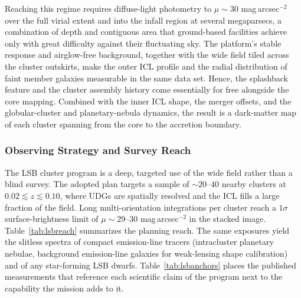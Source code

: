 Reaching this regime requires diffuse-light photometry to $\mu\sim30$ mag\,arcsec$^{-2}$ over the full virial extent and into the infall region at several megaparsecs, a combination of depth and contiguous area that ground-based facilities achieve only with great difficulty against their fluctuating sky. The platform's stable response and airglow-free background, together with the wide field tiled across the cluster outskirts, make the outer ICL profile and the radial distribution of faint member galaxies measurable in the same data set. Hence, the splashback feature and the cluster assembly history come essentially for free alongside the core mapping. Combined with the inner ICL shape, the merger offsets, and the globular-cluster and planetary-nebula dynamics, the result is a dark-matter map of each cluster spanning from the core to the accretion boundary.

\subsubsection{Observing Strategy and Survey Reach}

The LSB cluster program is a deep, targeted use of the wide field rather than a blind survey. The adopted plan targets a sample of $\sim20$--$40$ nearby clusters at $0.02\lesssim z\lesssim0.10$, where UDGs are spatially resolved and the ICL fills a large fraction of the field. Long multi-orientation integrations per cluster reach a $1\sigma$ surface-brightness limit of $\mu\sim29$--$30$ mag\,arcsec$^{-2}$ in the stacked image. Table~\ref{tab:lsbreach} summarizes the planning reach. The same exposures yield the slitless spectra of compact emission-line tracers (intracluster planetary nebulae, background emission-line galaxies for weak-lensing shape calibration) and of any star-forming LSB dwarfs. Table~\ref{tab:lsbanchors} places the published measurements that reference each scientific claim of the program next to the capability the mission adds to it.

